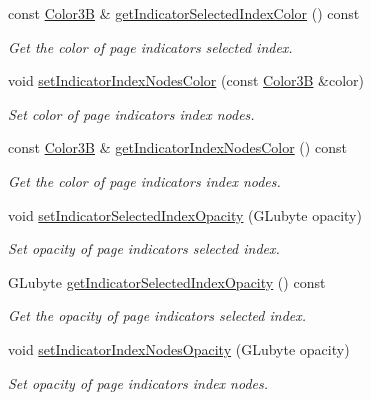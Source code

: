 \begin{DoxyCompactItemize}
const \hyperlink{structColor3B}{Color3B} \& \hyperlink{classui_1_1PageView_af5ee5b55b6e844913fe14e7ce069f1bc}{get\+Indicator\+Selected\+Index\+Color} () const
\begin{DoxyCompactList}\small\item\em Get the color of page indicator\textquotesingle{}s selected index. \end{DoxyCompactList}\item 
void \hyperlink{classui_1_1PageView_a6fa17a26a9819a05d61e4b77dbc62ff7}{set\+Indicator\+Index\+Nodes\+Color} (const \hyperlink{structColor3B}{Color3B} \&color)
\begin{DoxyCompactList}\small\item\em Set color of page indicator\textquotesingle{}s index nodes. \end{DoxyCompactList}\item 
const \hyperlink{structColor3B}{Color3B} \& \hyperlink{classui_1_1PageView_a7754d19d8e93f9654f2dc6a58e15131b}{get\+Indicator\+Index\+Nodes\+Color} () const
\begin{DoxyCompactList}\small\item\em Get the color of page indicator\textquotesingle{}s index nodes. \end{DoxyCompactList}\item 
void \hyperlink{classui_1_1PageView_afae2d00e007b00af99a2a372d27d6a1d}{set\+Indicator\+Selected\+Index\+Opacity} (G\+Lubyte opacity)
\begin{DoxyCompactList}\small\item\em Set opacity of page indicator\textquotesingle{}s selected index. \end{DoxyCompactList}\item 
G\+Lubyte \hyperlink{classui_1_1PageView_a87b0b8b5aead4fe196054cec54de1265}{get\+Indicator\+Selected\+Index\+Opacity} () const
\begin{DoxyCompactList}\small\item\em Get the opacity of page indicator\textquotesingle{}s selected index. \end{DoxyCompactList}\item 
void \hyperlink{classui_1_1PageView_a8ab3b4a36a80c6bcbe1d905ab572bcc1}{set\+Indicator\+Index\+Nodes\+Opacity} (G\+Lubyte opacity)
\begin{DoxyCompactList}\small\item\em Set opacity of page indicator\textquotesingle{}s index nodes. \end{DoxyCompactList}\item 

\end{DoxyCompactItemize}
